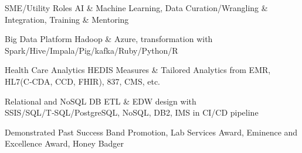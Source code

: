 

\begin{cvskills}

  \cvskill
    {SME/Utility Roles} %
    {AI \& Machine Learning, Data Curation/Wrangling \& Integration, Training \& Mentoring} %

  \cvskill
    {Big Data Platform} %
    {Hadoop \& Azure, transformation with Spark/Hive/Impala/Pig/kafka/Ruby/Python/R} %

  \cvskill
    {Health Care Analytics} %
    {HEDIS Measures \& Tailored Analytics from EMR, HL7(C‑CDA, CCD, FHIR), 837, CMS, etc.}

  \cvskill
    {Relational and NoSQL DB} %
    {ETL \& EDW design with SSIS/SQL/T‑SQL/PostgreSQL, NoSQL, DB2, IMS in CI/CD pipeline} %

  \cvskill
    {Demonstrated Past Success} %
    {Band Promotion, Lab Services Award, Eminence and Excellence Award, Honey Badger} %

\end{cvskills}





